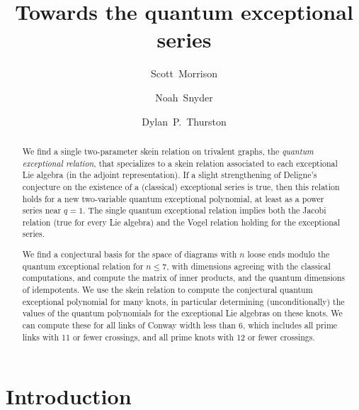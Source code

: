 \documentclass[12pt]{amsart}
\begin{document}
\title{Towards the quantum exceptional series}

\author[Morrison]{Scott~Morrison}
\address{Mathematical Sciences Institute, Australian National University}

\author[Snyder]{Noah~Snyder}
\address{Bloomington, Indiana, USA}

\author[Thurston]{Dylan~P.~Thurston}
\address{Bloomington, Indiana, USA}

\begin{abstract}
  We find a single two-parameter skein relation on trivalent graphs,
  the \emph{quantum exceptional relation}, that specializes to a skein
  relation associated to each exceptional Lie algebra (in the adjoint
  representation). If a slight
  strengthening of Deligne's conjecture on the existence of a
  (classical) exceptional series is true, then this relation
  holds for a new two-variable quantum exceptional polynomial, at
  least as a power series near $q=1$. The
  single quantum exceptional relation implies both the
  Jacobi relation (true for every Lie algebra) and
  the Vogel relation holding for the exceptional series.

  We find a conjectural basis for the space of diagrams with $n$ loose
  ends modulo the quantum exceptional relation for $n \le 7$, with
  dimensions agreeing with the classical computations, and compute
  the matrix of inner products, and the quantum dimensions of idempotents.
  We use the
  skein relation to compute the conjectural quantum exceptional
  polynomial for many knots, in particular
  determining (unconditionally) the values of the quantum polynomials
  for the exceptional Lie algebras on
  these knots. We can compute these for all links of Conway width less 
  than $6$, which includes all prime links with 11 or fewer crossings, and 
  all prime knots with 12 or fewer crossings.
\end{abstract}


\maketitle
{ \hypersetup{linkcolor=black}
  \tableofcontents }

\section{Introduction}
\label{sec:introduction}
\end{document}
